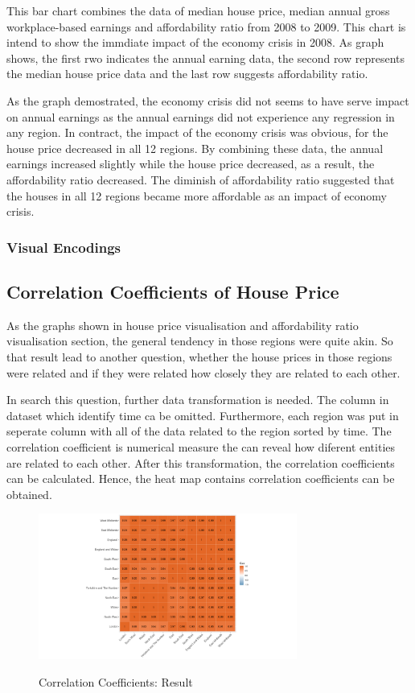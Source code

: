 \documentclass{article}
\begin{document}
This bar chart combines the data of median house price, median annual gross workplace-based earnings and 
affordability ratio from 2008 to 2009. This chart is intend to show the immdiate impact of the economy crisis 
in 2008. As graph shows, the first rwo indicates the annual earning data, the second row represents the median 
house price data and the last row suggests affordability ratio. 

As the graph demostrated, the economy crisis did not seems to have serve impact on annual earnings as the 
annual earnings did not experience any regression in any region. In contract, the impact of the economy crisis 
was obvious, for the house price decreased in all 12 regions. By combining these data, the annual earnings increased 
slightly while the house price decreased, as a result, the affordability ratio decreased. The diminish of 
affordability ratio suggested that the houses in all 12 regions became more affordable as an impact of 
economy crisis. 

\subsubsection{Visual Encodings}

\subsection{Correlation Coefficients of House Price}
As the graphs shown in house price visualisation and affordability ratio visualisation section, the general 
tendency in those regions were quite akin. So that result lead to another question, whether the house prices 
in those regions were related and if they were related how closely they are related to each other.

In search this question, further data transformation is needed. The column in dataset which identify time 
ca be omitted. Furthermore, each region was put in seperate column with all of the data related to the region 
sorted by time. The correlation coefficient is numerical measure the can reveal how diferent entities are 
related to each other. After this transformation, the correlation coefficients can be calculated. Hence, 
the heat map contains correlation coefficients can be obtained.

\begin{figure}[H]
  \begin{minipage}[b]{1.0\linewidth}
    \centering
    \centerline{\includegraphics[width=8.5cm]{corHeatMap}}
    \centerline{Correlation Coefficients: Result}\medskip
  \end{minipage}
\end{figure}
\end{document}
